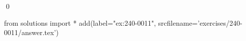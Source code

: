 
\begin{ex} 
  \label{ex:240-0011}
  
  \qed
\end{ex} 
\begin{python0}
from solutions import *
add(label="ex:240-0011",
    srcfilename='exercises/240-0011/answer.tex') 
\end{python0}
